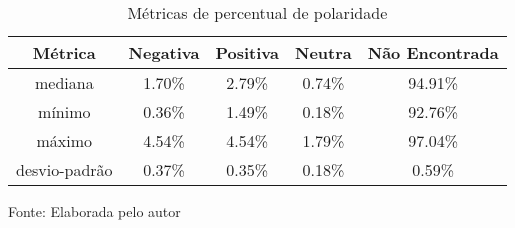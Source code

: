
\begin{table}[h] 
\centering
\caption{Métricas de percentual de polaridade}
\label{tab:cap2_analise_descritiva}
\begin{tabular}{ccccc}
Métrica & Negativa & Positiva & Neutra & Não Encontrada \\
\hline
mediana & 1.70\% & 2.79\% & 0.74\% & 94.91\% \\
mínimo & 0.36\% & 1.49\% & 0.18\% & 92.76\% \\
máximo & 4.54\% & 4.54\% & 1.79\% & 97.04\% \\
desvio-padrão & 0.37\% & 0.35\% & 0.18\% & 0.59\% \\
\hline
\end{tabular}

Fonte: Elaborada pelo autor
\end{table}
